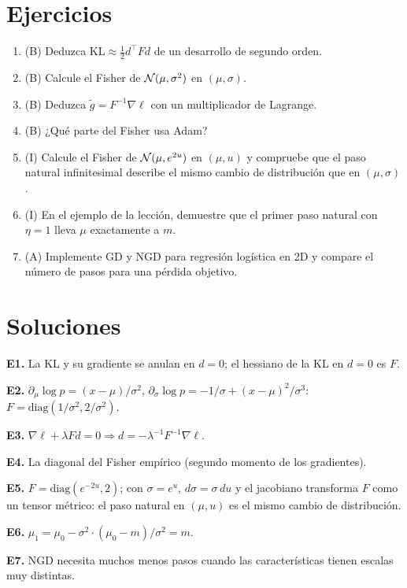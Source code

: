 \documentclass[11pt,a4paper]{article}
\begin{document}
\section{Ejercicios}
\begin{enumerate}[label=\textbf{E\arabic*.}]
\item (B) Deduzca $\mathrm{KL}\approx\frac12d^\top Fd$ de un desarrollo de segundo orden.
\item (B) Calcule el Fisher de $\mathcal{N}(\mu,\sigma^2)$ en $(\mu,\sigma)$.
\item (B) Deduzca $\tilde g=F^{-1}\nabla\ell$ con un multiplicador de Lagrange.
\item (B) ¿Qué parte del Fisher usa Adam?
\item (I) Calcule el Fisher de $\mathcal{N}(\mu,e^{2u})$ en $(\mu,u)$ y compruebe que el paso natural infinitesimal describe el mismo cambio de distribución que en $(\mu,\sigma)$.
\item (I) En el ejemplo de la lección, demuestre que el primer paso natural con $\eta=1$ lleva $\mu$ exactamente a $m$.
\item (A) Implemente GD y NGD para regresión logística en 2D y compare el número de pasos para una pérdida objetivo.
\end{enumerate}
\section{Soluciones}
\begin{solucion}
\textbf{E1.} La KL y su gradiente se anulan en $d=0$; el hessiano de la KL en $d=0$ es $F$.

\textbf{E2.} $\partial_\mu\log p=(x-\mu)/\sigma^2$, $\partial_\sigma\log p=-1/\sigma+(x-\mu)^2/\sigma^3$: $F=\mathrm{diag}(1/\sigma^2,2/\sigma^2)$.

\textbf{E3.} $\nabla\ell+\lambda Fd=0\Rightarrow d=-\lambda^{-1}F^{-1}\nabla\ell$.

\textbf{E4.} La diagonal del Fisher empírico (segundo momento de los gradientes).

\textbf{E5.} $F=\mathrm{diag}(e^{-2u},2)$; con $\sigma=e^u$, $d\sigma=\sigma\,du$ y el jacobiano transforma $F$ como un tensor métrico: el paso natural en $(\mu,u)$ es el mismo cambio de distribución.

\textbf{E6.} $\mu_1=\mu_0-\sigma^2\cdot(\mu_0-m)/\sigma^2=m$.

\textbf{E7.} NGD necesita muchos menos pasos cuando las características tienen escalas muy distintas.
\end{solucion}
\end{document}
